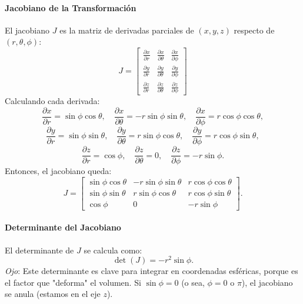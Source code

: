 \documentclass[11pt]{book}
\theoremstyle{definicion}
\theoremstyle{teorema}
\theoremstyle{ejemplo}
\begin{document}
\paragraph{Jacobiano de la Transformación}
El jacobiano \( J \) es la matriz de derivadas parciales de \((x, y, z)\) respecto de \((r, \theta, \phi)\):
\[
J = \begin{bmatrix}
\frac{\partial x}{\partial r} & \frac{\partial x}{\partial \theta} & \frac{\partial x}{\partial \phi} \\
\frac{\partial y}{\partial r} & \frac{\partial y}{\partial \theta} & \frac{\partial y}{\partial \phi} \\
\frac{\partial z}{\partial r} & \frac{\partial z}{\partial \theta} & \frac{\partial z}{\partial \phi}
\end{bmatrix}
\]
Calculando cada derivada:
\[
\frac{\partial x}{\partial r} = \sin \phi \cos \theta, \quad \frac{\partial x}{\partial \theta} = -r \sin \phi \sin \theta, \quad \frac{\partial x}{\partial \phi} = r \cos \phi \cos \theta,
\]
\[
\frac{\partial y}{\partial r} = \sin \phi \sin \theta, \quad \frac{\partial y}{\partial \theta} = r \sin \phi \cos \theta, \quad \frac{\partial y}{\partial \phi} = r \cos \phi \sin \theta,
\]
\[
\frac{\partial z}{\partial r} = \cos \phi, \quad \frac{\partial z}{\partial \theta} = 0, \quad \frac{\partial z}{\partial \phi} = -r \sin \phi.
\]
Entonces, el jacobiano queda:
\[
J = \begin{bmatrix}
\sin \phi \cos \theta & -r \sin \phi \sin \theta & r \cos \phi \cos \theta \\
\sin \phi \sin \theta & r \sin \phi \cos \theta & r \cos \phi \sin \theta \\
\cos \phi & 0 & -r \sin \phi
\end{bmatrix}.
\]

\paragraph{Determinante del Jacobiano}
El determinante de \( J \) se calcula como:
\[
\det(J) = - r^2 \sin \phi.
\]
\emph{Ojo}: Este determinante es clave para integrar en coordenadas esféricas, porque es el factor que "deforma" el volumen. Si \(\sin \phi = 0\) (o sea, \(\phi = 0\) o \(\pi\)), el jacobiano se anula (estamos en el eje \(z\)).

\end{document}

